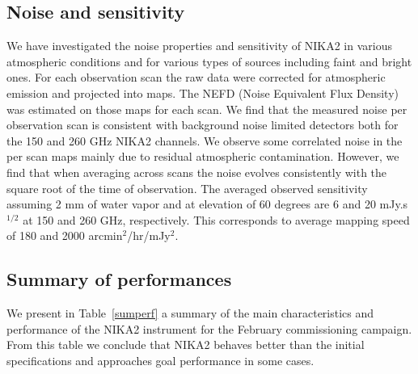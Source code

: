 \documentclass[]{aa} %
\begin{document}
\subsection{Noise and sensitivity}
\label{Noise and sensitivity}
We have investigated the noise properties and sensitivity of NIKA2 in various atmospheric conditions and for various types of sources including faint and bright ones. For each observation scan the raw data were corrected for atmospheric emission and projected into maps. The NEFD (Noise Equivalent Flux Density) was estimated on those maps for each scan.
We find that the measured noise per observation scan is consistent with background noise limited detectors both for the 150 and 260 GHz NIKA2 channels. We observe some correlated noise in the per scan maps mainly due to residual atmospheric contamination. However, we find that when averaging across scans the noise evolves consistently with the square root of the time of observation. The averaged observed sensitivity assuming 2 mm of water vapor and at elevation of 60 degrees are 6 and 20 mJy.s$^{1/2}$ at 150 and 260 GHz, respectively. This corresponds to average mapping speed of 180 and 2000 arcmin$^2$/hr/mJy$^2$. 

\subsection{Summary of performances}
We present in Table~\ref{sumperf} a summary of the main characteristics and performance of the NIKA2 instrument for the February commissioning campaign. From this table we conclude that NIKA2 behaves better than the initial specifications \cite{ltd16:2016} and approaches goal performance in some cases. 
\end{document}
